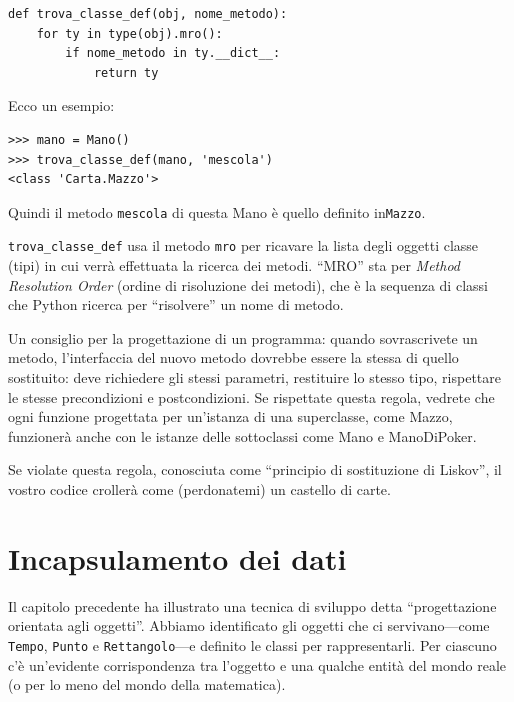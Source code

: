 \documentclass[10pt]{book}
\begin{document}
\begin{verbatim}
def trova_classe_def(obj, nome_metodo):
    for ty in type(obj).mro():
        if nome_metodo in ty.__dict__:
            return ty
\end{verbatim}
%
Ecco un esempio:

\begin{verbatim}
>>> mano = Mano()
>>> trova_classe_def(mano, 'mescola')
<class 'Carta.Mazzo'>
\end{verbatim}
%
Quindi il metodo {\tt mescola} di questa Mano è quello definito in{\tt Mazzo}.

\verb"trova_classe_def" usa il metodo {\tt mro} per ricavare la lista degli oggetti classe (tipi) in cui verrà effettuata la ricerca dei metodi.  ``MRO'' sta per {\em Method Resolution Order} (ordine di risoluzione dei metodi), che è la sequenza di classi che Python ricerca per ``risolvere'' un nome di metodo.

Un consiglio per la progettazione di un programma: quando sovrascrivete un metodo, l'interfaccia del nuovo metodo dovrebbe essere la stessa di quello sostituito: deve richiedere gli stessi parametri, restituire lo stesso tipo, rispettare le stesse precondizioni e postcondizioni. Se rispettate questa regola, vedrete che ogni funzione progettata per un'istanza di una superclasse, come Mazzo, funzionerà anche con le istanze delle sottoclassi come Mano e ManoDiPoker.

Se violate questa regola, conosciuta come ``principio di sostituzione di Liskov'', il vostro codice crollerà come (perdonatemi) un castello di carte.

\section{Incapsulamento dei dati}

Il capitolo precedente ha illustrato una tecnica di sviluppo detta
``progettazione orientata agli oggetti''.  Abbiamo identificato gli oggetti che ci servivano---come {\tt Tempo}, {\tt Punto} e {\tt Rettangolo}---e definito le classi per rappresentarli. Per ciascuno c'è un'evidente corrispondenza tra l'oggetto e una qualche entità del mondo reale (o per lo meno del mondo della matematica).
\end{document}
